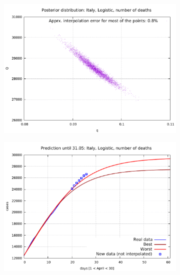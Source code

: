 \documentclass[8pt]{article}
\begin{document}
\begin{figure}[h!]
  \centering
  \begin{subfigure}[b]{0.5\linewidth}
  \includegraphics[width=\linewidth]{../it_l_d/posterior.pdf}
  \end{subfigure}  \begin{subfigure}[b]{0.48\linewidth}
    \includegraphics[width=\linewidth]{../it_l_d/prediction.pdf}
  \end{subfigure}
  \begin{subfigure}[b]{0.48\linewidth}

\end{subfigure}
\end{figure}
\end{document}

